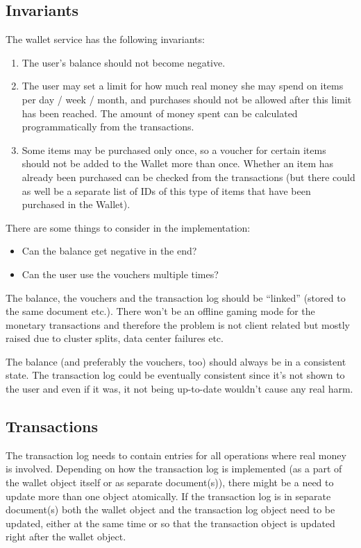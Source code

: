 \documentclass[11pt,a4paper]{report}
\begin{document}
\subsection{Invariants}
The wallet  service has the following invariants:
\begin{enumerate}
\item The user's balance should not become negative.
\item The user may set a limit for how much real money she may spend on items per day / week / month, and purchases should not be allowed after this limit has been reached. The amount of money spent can be calculated programmatically from the transactions.
\item Some items may be purchased only once, so a voucher for certain items should not be added to the Wallet more than once. Whether an item has already been purchased can be checked from the transactions (but there could as well be a separate list of IDs of this type of items that have been purchased in the Wallet).
\end{enumerate}
There are some things to consider in the implementation:

\begin{itemize}
\item Can the balance get negative in the end?
\item Can the user use the vouchers multiple times?
\end{itemize}

The balance, the vouchers and the transaction log should be ``linked'' (stored to the same document etc.). There won't be an offline gaming mode for the monetary transactions and therefore the problem is not client related but mostly raised due to cluster splits, data center failures etc.

The balance (and preferably the vouchers, too) should always be in a consistent state. 
The transaction log could be eventually consistent since it's not shown to the user and even if it was, it not being up­-to-­date wouldn't cause any real harm.

\subsection{Transactions}
The transaction log needs to contain entries for all operations where real money is involved. Depending on how the transaction log is implemented (as a part of the wallet object itself or as separate document(s)), there might be a need to update more than one object atomically. If the transaction log is in separate document(s) both the wallet object and the transaction log object need to be updated, either at the same time or so that the transaction object is updated right after the wallet object.
\end{document}
